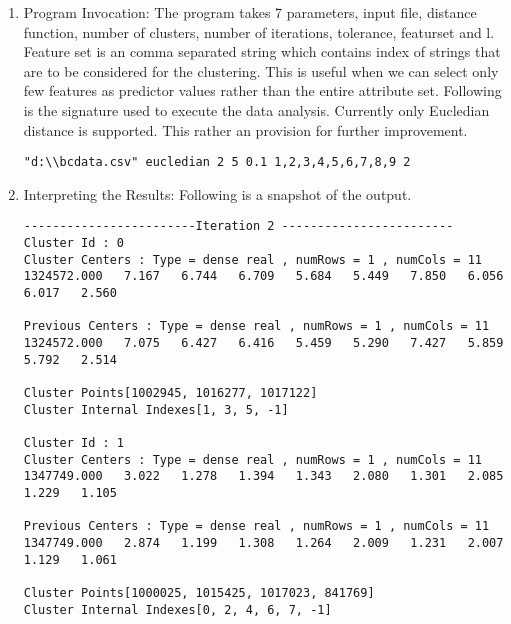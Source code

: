 \documentclass{article}
\begin{document}
\begin{enumerate}
\begin{enumerate}
\begin{verbatim}
\end{verbatim}
\item Program Invocation: The program takes 7 parameters, input file, distance function, number of clusters, number of iterations, tolerance, featurset and l. Feature set is an comma separated string which contains index of strings that are to be considered for the clustering. This is useful when we can select only few features as predictor values rather than the entire attribute set. Following is the signature used to execute the data analysis. Currently only Eucledian distance is supported. This rather an provision for further improvement.
\begin{verbatim}
"d:\\bcdata.csv" eucledian 2 5 0.1 1,2,3,4,5,6,7,8,9 2
\end{verbatim}
\item Interpreting the Results: Following is a snapshot of the output.
\begin{verbatim}
------------------------Iteration 2 ------------------------
Cluster Id : 0
Cluster Centers : Type = dense real , numRows = 1 , numCols = 11
1324572.000   7.167   6.744   6.709   5.684   5.449   7.850   6.056   6.017   2.560

Previous Centers : Type = dense real , numRows = 1 , numCols = 11
1324572.000   7.075   6.427   6.416   5.459   5.290   7.427   5.859   5.792   2.514

Cluster Points[1002945, 1016277, 1017122]
Cluster Internal Indexes[1, 3, 5, -1]

Cluster Id : 1
Cluster Centers : Type = dense real , numRows = 1 , numCols = 11
1347749.000   3.022   1.278   1.394   1.343   2.080   1.301   2.085   1.229   1.105  

Previous Centers : Type = dense real , numRows = 1 , numCols = 11
1347749.000   2.874   1.199   1.308   1.264   2.009   1.231   2.007   1.129   1.061  

Cluster Points[1000025, 1015425, 1017023, 841769]
Cluster Internal Indexes[0, 2, 4, 6, 7, -1]


\end{verbatim}
\end{enumerate}
\end{enumerate}
\end{document}
